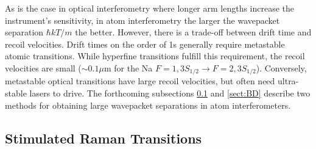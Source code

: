 \documentclass[reprint,
nofootinbib,
amsmath,amssymb,
aps]{revtex4-1}
\begin{document}
As is the case in optical interferometry where longer arm lengths increase the instrument's sensitivity, in atom interferometry the larger the wavepacket separation $\hbar k T /m$ the better. However, there is a trade-off between drift time and recoil velocities. Drift times on the order of 1s generally require metastable atomic transitions. While hyperfine transitions fulfill this requirement, the recoil velocities are small ($\sim 0.1 \mu\text{m}$ for the Na $F=1, 3S_{1/2}\to F=2,3S_{1/2}$). Conversely, metastable optical transitions have large recoil velocities, but often need ultra-stable lasers to drive. The forthcoming subsections \ref{sect:SRT} and \ref{sect:BD} describe two methods for obtaining large wavepacket separations in atom interferometers. 



\subsection{Stimulated Raman Transitions}\label{sect:SRT}
\end{document}
